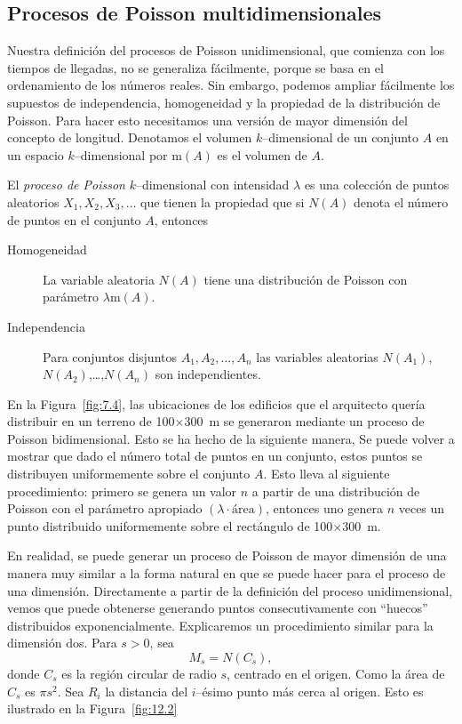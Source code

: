 \subsection{Procesos de Poisson multidimensionales}

	Nuestra definición del procesos de Poisson unidimensional, que comienza con los tiempos de llegadas, no se generaliza fácilmente, porque se basa en el ordenamiento de los números reales. Sin embargo, podemos ampliar fácilmente los supuestos de independencia, homogeneidad y la propiedad de la distribución de Poisson. Para hacer esto necesitamos una versión de mayor dimensión del concepto de longitud. Denotamos el volumen $k$--dimensional de un conjunto $A$ en un espacio $k$--dimensional por $\mathrm{m}\left(A\right)$ es el volumen de $A$.
	\begin{definition}
		El \textit{proceso de Poisson} $k$--dimensional con intensidad $\lambda$ es una colección de puntos aleatorios $X_{1}, X_{2}, X_{3},\ldots$ que tienen la propiedad que si $N\left(A\right)$ denota el número de puntos en el conjunto $A$, entonces
		\begin{description}
			\item[Homogeneidad] La variable aleatoria $N\left(A\right)$ tiene una distribución de Poisson con parámetro $\lambda\mathrm{m}\left(A\right)$.
			\item[Independencia] Para conjuntos disjuntos $A_{1}, A_{2},\ldots, A_{n}$ las variables aleatorias $N\left(A_{1}\right)$, $N\left(A_{2}\right)$,\ldots,$N\left(A_{n}\right)$ son independientes.
		\end{description}
	\end{definition}
	En la Figura~\ref{fig:7.4}, las ubicaciones de los edificios que el arquitecto quería distribuir en un terreno de \num{100}$\times$\SI{300}{\metre} se generaron mediante un proceso de Poisson bidimensional. Esto se ha hecho de la siguiente manera, Se puede volver a mostrar que dado el número total de puntos en un conjunto, estos puntos se distribuyen uniformemente sobre el conjunto $A$. Esto lleva al siguiente procedimiento: primero se genera un valor $n$ a partir de una distribución de Poisson con el parámetro apropiado $\left(\lambda\cdot\text{área}\right)$, entonces uno genera $n$ veces un punto distribuido uniformemente sobre el rectángulo de \num{100}$\times$\SI{300}{\metre}.

	En realidad, se puede generar un proceso de Poisson de mayor dimensión de una manera muy similar a la forma natural en que se puede hacer para el proceso de una dimensión. Directamente a partir de la definición del proceso unidimensional, vemos que puede obtenerse generando puntos consecutivamente con ``huecos'' distribuidos exponencialmente. Explicaremos un procedimiento similar para la dimensión dos. Para $s>0$, sea
	\[
		M_{s}=N\left(C_{s}\right),
	\]
	donde $C_{s}$ es la región circular de radio $s$, centrado en el origen. Como la área de $C_{s}$ es $\pi s^{2}$. Sea $R_{i}$ la distancia del $i$--ésimo punto más cerca al origen. Esto es ilustrado en la Figura~\ref{fig:12.2}


